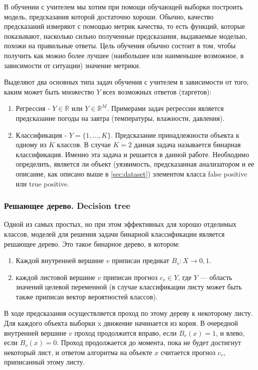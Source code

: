 В обучении с учителем мы хотим при помощи обучающей выборки построить модель, предсказания которой достаточно хороши. Обычно, качество предсказаний измеряют с помощью метрик качества, то есть функций, которые показывают, насколько сильно полученные предсказания, выдаваемые моделью, похожи на правильные ответы. Цель обучения обычно состоит в том, чтобы получить как можно более лучшее (наибольшее или наименьшее возможное, в зависимости от ситуации) значение метрики.

Выделяют два основных типа задач обучения с учителем в зависимости от того, каким может быть множество $Y$ всех возможных ответов (таргетов):

\begin{enumerate}
    \item Регрессия - $Y \in \mathbb{R}$ или $Y \in \mathbb{R}^M$. Примерами задач регрессии является предсказание погоды на завтра (температуры, влажности, давления).
    \item Классификация - $Y = \{1,...,K\}$. Предсказание принадлежности объекта к одному из $K$ классов. В случае $K = 2$ данная задача называется бинарная классификация. Именно эта задача и решается в данной работе. Необходимо определить, является ли объект (уязвимость, предсказанная анализатором и ее описание, как описано выше в \ref{sec:dataset}) элементом класса false positive или true positive.
\end{enumerate}

\subsubsection{Решающее дерево. Decision tree}
Одной из самых простых, но при этом эффективных для хорошо отделимых классов, моделей для решения задачи бинарной классификации является решающее дерево. Это такое бинарное дерево, в котором:
\begin{enumerate}
    \item Каждой внутренней вершине $v$ приписан предикат $B_v: X \rightarrow {0, 1}$.
    \item каждой листовой вершине $v$ приписан прогноз $c_v \in Y$, где $Y$ — область значений целевой переменной (в случае классификации листу может быть также приписан вектор вероятностей классов).
\end{enumerate}

В ходе предсказания осуществляется проход по этому дереву к некоторому листу. Для каждого объекта выборки x движение начинается из корня. В очередной внутренней вершине $v$ проход продолжится вправо, если $B_v(x)=1$, и влево, если $B_v(x)=0$. Проход продолжается до момента, пока не будет достигнут некоторый лист, и ответом алгоритма на объекте $x$ считается прогноз $c_v$, приписанный этому листу\cite{SHAD-trees}.

